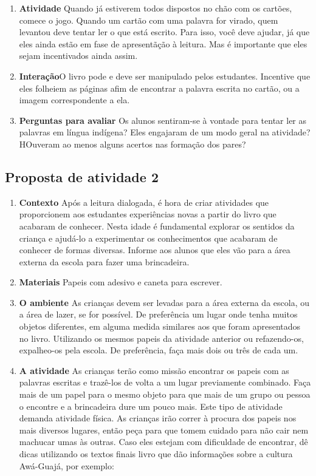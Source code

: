 \documentclass[11pt]{extarticle}
\begin{document}
{{\begin{enumerate}
\item \textbf{Atividade}\quad 
Quando já estiverem todos dispostos no chão com os cartões, comece o jogo. 
Quando um cartão com uma palavra for virado, quem levantou deve tentar ler o que está escrito.
Para isso, você deve ajudar, já que eles ainda estão em fase de apresentãção à leitura.
Mas é importante que eles sejam incentivados ainda assim. 


\item \textbf{Interação}\quad O livro pode e deve ser 
manipulado pelos estudantes. Incentive que eles folheiem as páginas afim de encontrar a palavra 
escrita no cartão, ou a imagem correspondente a ela. 


\item \textbf{Perguntas para avaliar}\quad
Os alunos sentiram-se à vontade para tentar ler as palavras em língua 
indígena? Eles engajaram de um modo geral na atividade? 
HOuveram ao menos alguns acertos nas formação dos pares? 


\end{enumerate}
\subsection{Proposta de atividade 2}

\begin{enumerate}
\item \textbf{Contexto}\quad 
Após a leitura dialogada, é hora de criar 
atividades que proporcionem aos estudantes experiências novas a partir do livro
que acabaram de conhecer. Nesta idade é fundamental explorar os sentidos da criança e 
ajudá-lo a experimentar os conhecimentos que acabaram de conhecer de formas diversas. 
Informe aos alunos que eles vão para a área externa da escola para fazer uma brincadeira. 

\item \textbf{Materiais}\quad
Papeis com adesivo e caneta para escrever.

\item \textbf{O ambiente}\quad 
As crianças devem ser levadas para a área externa da escola, ou 
a área de lazer, se for possível. De preferência um lugar onde tenha 
muitos objetos diferentes, em alguma medida similares aos que foram 
apresentados no livro. Utilizando os mesmos papeis da atividade anterior ou refazendo-os,
expalheo-os pela escola. De preferência, faça mais dois ou três de cada um.

\item \textbf{A atividade}\quad 
As crianças terão como missão encontrar os papeis com as palavras escritas 
e trazê-los de volta a um lugar previamente combinado. Faça mais de um 
papel para o mesmo objeto para que mais de um grupo ou pessoa o encontre e 
a brincadeira dure um pouco mais. Este tipo de atividade demanda atividade física. 
As crianças irão correr à procura dos papeis nos mais diversos lugares, então 
peça para que tomem cuidado para não cair nem machucar umas às outras. 
Caso eles estejam com dificuldade de encontrar, dê dicas utilizando 
os textos finais livro que dão informações sobre a cultura Awá-Guajá, por exemplo: 


\end{enumerate}}}
\end{document}
